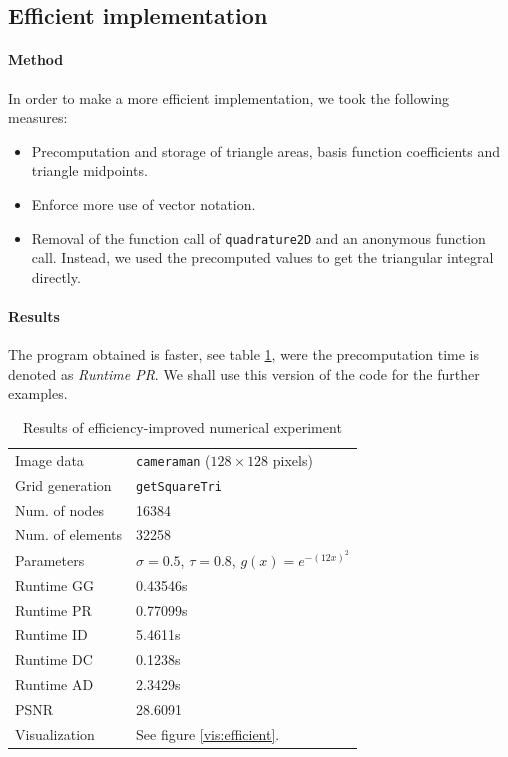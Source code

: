 \documentclass{report}
\begin{document}
\subsection{Efficient implementation}

\paragraph{Method}

In order to make a more efficient implementation, we took the following measures:

\begin{itemize}
    \item
    Precomputation and storage of triangle areas, basis function coefficients and triangle midpoints.
    \item 
    Enforce more use of vector notation.
    \item 
    Removal of the function call of \texttt{quadrature2D} and an anonymous function call. Instead, we used the precomputed values to get the triangular integral directly.
\end{itemize}

\paragraph{Results}

The program obtained is faster, see table \ref{res:efficient}, were the precomputation time is denoted as \textit{Runtime PR}. We shall use this version of the code for the further examples.

\begin{table}[h]
	\centering
	\begin{tabular}{|ll}
		Image data & \texttt{cameraman} ($128 \times 128$ pixels) \\
		Grid generation & \texttt{getSquareTri} \\
		Num. of nodes & 16384\\
		Num. of elements & 32258\\
		Parameters & $\sigma=0.5$, $\tau=0.8$, $g(x) = e^{-(12 x)^2}$ \\
		Runtime GG & 0.43546s \\
		Runtime PR & 0.77099s \\
		Runtime ID & 5.4611s \\
		Runtime DC & 0.1238s \\
		Runtime AD & 2.3429s \\
		PSNR & 28.6091 \\
		Visualization & See figure \ref{vis:efficient}.\\
	\end{tabular}
	\caption{Results of efficiency-improved numerical experiment}
	\label{res:efficient}
\end{table}
\end{document}
